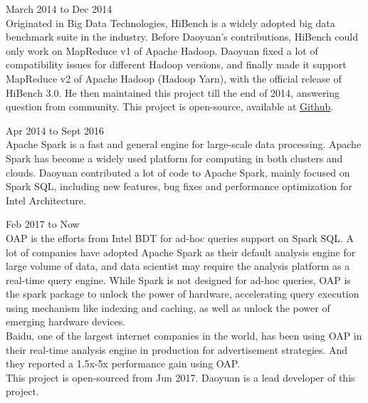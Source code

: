 \documentclass[line,margin]{res}
\begin{document}
\begin{resume}
\begin{outline}
              \hfill        March 2014 to Dec 2014\\
                Originated in Big Data Technologies, HiBench is a widely adopted big data benchmark suite in the industry. Before Daoyuan's contributions, HiBench could only work on MapReduce v1 of Apache Hadoop. Daoyuan fixed a lot of compatibility issues for different Hadoop versions, and finally made it support MapReduce v2 of Apache Hadoop (Hadoop Yarn), with the official release of HiBench 3.0. He then maintained this project till the end of 2014, answering question from community. This project is open-source, available at \href{https://github.com/intel-hadoop/HiBench}{Github}.
                   
             \hfill        Apr 2014 to Sept 2016 \\
                Apache Spark is a fast and general engine for large-scale data processing. Apache Spark has become a widely used platform for computing in both clusters and clouds. Daoyuan contributed a lot of code to Apache Spark, mainly focused on Spark SQL, including new features, bug fixes and performance optimization for Intel Architecture.
                   
              \hfill        Feb 2017 to Now\\
                OAP is the efforts from Intel BDT for ad-hoc queries support on Spark SQL. A lot of companies have adopted Apache Spark as their default analysis engine for large volume of data, and data scientist may require the analysis platform as a real-time query engine. While Spark is not designed for ad-hoc queries, OAP is the spark package to unlock the power of hardware, accelerating query execution using mechanism like indexing and caching, as well as unlock the power of emerging hardware devices. \\
                Baidu, one of the largest internet companies in the world, has been using OAP in their real-time analysis engine in production for advertisement strategies. And they reported a 1.5x-5x performance gain using OAP.\\
                This project is open-sourced from Jun 2017. Daoyuan is a lead developer of this project.
        \end{outline}


\end{resume}
\end{document}
